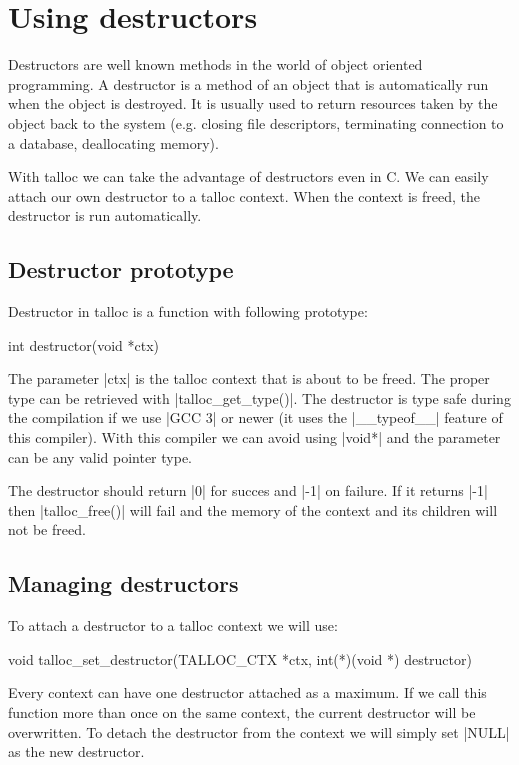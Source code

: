 \section{Using destructors}
\label{talloc:sec:destructors}

Destructors are well known methods in the world of object oriented programming.
A destructor is a method of an object that is automatically run when the object
is destroyed. It is usually used to return resources taken by the object back to
the system (e.g. closing file descriptors, terminating connection to a database,
deallocating memory).

With talloc we can take the advantage of destructors even in C. We can easily
attach our own destructor to a talloc context. When the context is freed, the
destructor is run automatically.

\subsection{Destructor prototype}

Destructor in talloc is a function with following prototype:

\begin{funcproto}
int destructor(void *ctx)
\end{funcproto}
\funclistend
The parameter |ctx| is the talloc context that is about to be freed. The proper
type can be retrieved with |talloc_get_type()|. The destructor is type safe during
the compilation if we use |GCC 3| or newer (it uses the |__typeof__|
feature of this compiler). With this compiler we can avoid 
using |void*| and the parameter can be any valid pointer type.

The destructor should return |0| for succes and |-1| on failure. If it returns
|-1| then |talloc_free()| will fail and the memory of the context and its
children will not be freed.

\subsection{Managing destructors}

To attach a destructor to a talloc context we will use:

\begin{funcproto}
void talloc_set_destructor(TALLOC_CTX *ctx,
                           int(*)(void *) destructor) 
\end{funcproto}
\funclistend
Every context can have one destructor attached as a maximum. If we call this
function more than once on the same context, the current destructor will be
overwritten. To detach the destructor from the context we will simply set
|NULL| as the new destructor.

